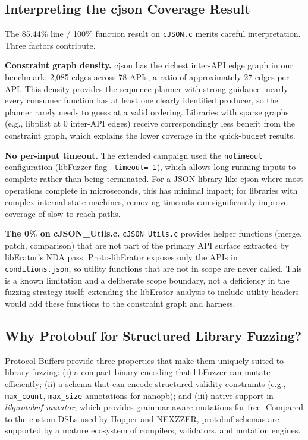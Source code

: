 \documentclass[sigconf,anonymous]{acmart}
\begin{document}
\subsection{Interpreting the cjson Coverage Result}

The 85.44\% line / 100\% function result on \texttt{cJSON.c} merits
careful interpretation.  Three factors contribute.

\textbf{Constraint graph density.}  cjson has the richest inter-API
edge graph in our benchmark: 2,085 edges across 78 APIs, a ratio of
approximately 27 edges per API.  This density provides the sequence
planner with strong guidance: nearly every consumer function has at
least one clearly identified producer, so the planner rarely needs to
guess at a valid ordering.  Libraries with sparse graphs (e.g., libplist
at 0 inter-API edges) receive correspondingly less benefit from the
constraint graph, which explains the lower coverage in the quick-budget
results.

\textbf{No per-input timeout.}  The extended campaign used the
\texttt{notimeout} configuration (libFuzzer flag \texttt{-timeout=-1}),
which allows long-running inputs to complete rather than being
terminated.  For a JSON library like cjson where most operations
complete in microseconds, this has minimal impact; for libraries with
complex internal state machines, removing timeouts can significantly
improve coverage of slow-to-reach paths.

\textbf{The 0\% on cJSON\_Utils.c.}  \texttt{cJSON\_Utils.c} provides
helper functions (merge, patch, comparison) that are not part of the
primary API surface extracted by libErator's NDA pass.  Proto-libErator
exposes only the APIs in \texttt{conditions.json}, so utility functions
that are not in scope are never called.  This is a known limitation
and a deliberate scope boundary, not a deficiency in the fuzzing
strategy itself; extending the libErator analysis to include utility
headers would add these functions to the constraint graph and harness.

\subsection{Why Protobuf for Structured Library Fuzzing?}

Protocol Buffers provide three properties that make them uniquely suited
to library fuzzing: (i) a compact binary encoding that libFuzzer can
mutate efficiently; (ii) a schema that can encode structured validity
constraints (e.g., \texttt{max\_count}, \texttt{max\_size} annotations
for nanopb); and (iii) native support in \textit{libprotobuf-mutator},
which provides grammar-aware mutations for free.  Compared to the custom
DSLs used by Hopper and NEXZZER, protobuf schemas are supported by a
mature ecosystem of compilers, validators, and mutation engines.
\end{document}
